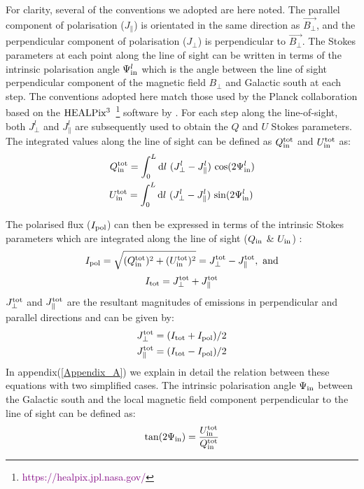 \documentclass[12pt, a4 paper]{mnras}
\begin{document}
For clarity, several of the conventions we adopted are here noted. The parallel component of polarisation (${J_{\parallel}}$) is orientated in the same direction as  $\vec{B_{\perp}}$, and the perpendicular component of polarisation (${J_{\perp}}$) is perpendicular to $\vec{B_{\perp}}$. The Stokes parameters at each point along the line of sight can be written in terms of the intrinsic polarisation angle $\Psi^l_{\rm in}$ which is the angle between the line of sight perpendicular component of the magnetic field $B_{\perp}$ and Galactic south at each step. The conventions adopted here match those used by the Planck collaboration \cite{Planck_XIX} based on the $\rm HEALPix^3$~\footnote{\textcolor{purple}{https://healpix.jpl.nasa.gov/}} software by \cite{Healpix_2005}. For each step along the line-of-sight, both  ${J_{\perp}^l}$ and ${J_{\parallel}^l}$ are subsequently used to obtain the $Q$ and $U$ Stokes parameters. The integrated values along the line of sight can be defined as  $Q^{\rm tot}_{\rm in}$ and $U^{\rm tot}_{\rm in}$ as:
\begin{eqnarray}
Q_{\rm in}^{\rm tot} = {\int_0^L \mathrm{d}l \ ({J_{\perp}^l} - J_{\parallel}^l) \ {\cos}(2\Psi^l_{\rm in}) } \\
U_{\rm in}^{\rm tot} = {\int_0^L \mathrm{d}l \ ({J_{\perp}^l} - J_{\parallel}^l) \ {\sin}(2\Psi^l_{\rm in})} \,
\end{eqnarray}

The polarised flux ($I_{\rm pol}$) can then be expressed in terms of the intrinsic Stokes parameters which are integrated along the line of sight (${Q_{\rm in}}$ \& ${U_{\rm in}}$) :
\begin{eqnarray} \label{eq_I_pol}
I_{\rm pol} = \sqrt{(Q_{\rm in}^{\rm tot})^2+(U_{\rm in}^{\rm tot})^2} = J_{\perp}^{\rm tot} - J_{\parallel}^{\rm tot} ,\ \rm and
\end{eqnarray}
\begin{equation} \label{eq_I_tot}
    I_{\rm tot} = J_{\perp}^{\rm tot} + J_{\parallel}^{\rm tot} 
\end{equation}
$J_{\perp}^{\rm tot}$ and $J_{\parallel}^{\rm tot}$ are the resultant magnitudes of emissions in perpendicular and parallel directions and can be given by:
\begin{eqnarray}
J_{\perp}^{\rm tot} = (I_{\rm tot} + I_{\rm pol})/2 \\
J_{\parallel}^{\rm tot} = (I_{\rm tot} - I_{\rm pol})/2 
\end{eqnarray}
In appendix(\ref{Appendix_A}) we explain in detail the relation between these equations with two simplified cases.
The intrinsic polarisation angle $\Psi_{\rm in}$ between the Galactic south and the local magnetic field component perpendicular to the line of sight can be defined as:
\begin{eqnarray}
\tan(2\Psi_{\rm in}) = \frac{U_{\rm in}^{\rm tot}}{Q_{\rm in}^{\rm tot}} 
\end{eqnarray}
\end{document}

